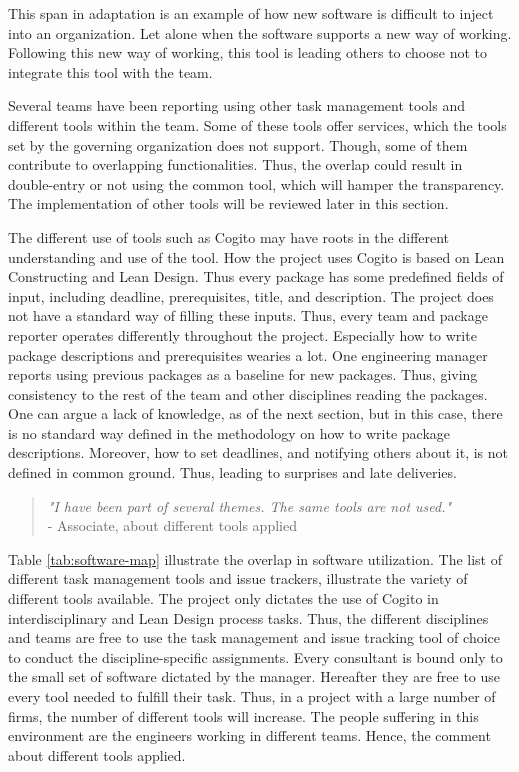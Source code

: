 This span in adaptation is an example of how new software is difficult to inject into an organization. Let alone when the software supports a new way of working. Following this new way of working, this tool is leading others to choose not to integrate this tool with the team.

Several teams have been reporting using other task management tools and different tools within the team. Some of these tools offer services, which the tools set by the governing organization does not support. Though, some of them contribute to overlapping functionalities. Thus, the overlap could result in double-entry or not using the common tool, which will hamper the transparency. The implementation of other tools will be reviewed later in this section. 

The different use of tools such as Cogito may have roots in the different understanding and use of the tool. How the project uses Cogito is based on Lean Constructing and Lean Design. Thus every package has some predefined fields of input, including deadline, prerequisites, title, and description. The project does not have a standard way of filling these inputs. Thus, every team and package reporter operates differently throughout the project. Especially how to write package descriptions and prerequisites wearies a lot. 
One engineering manager reports using previous packages as a baseline for new packages. Thus, giving consistency to the rest of the team and other disciplines reading the packages. One can argue a lack of knowledge, as of the next section, but in this case, there is no standard way defined in the methodology on how to write package descriptions. Moreover, how to set deadlines, and notifying others about it, is not defined in common ground. Thus, leading to surprises and late deliveries. 

\begin{quote}
    \textit{"I have been part of several themes. The same tools are not used."}
    \\ - Associate, about different tools applied
\end{quote}

Table \ref{tab:software-map} illustrate the overlap in software utilization. The list of different task management tools and issue trackers, illustrate the variety of different tools available. The project only dictates the use of Cogito in interdisciplinary and Lean Design process tasks. Thus, the different disciplines and teams are free to use the task management and issue tracking tool of choice to conduct the discipline-specific assignments. Every consultant is bound only to the small set of software dictated by the manager. Hereafter they are free to use every tool needed to fulfill their task. Thus, in a project with a large number of firms, the number of different tools will increase. The people suffering in this environment are the engineers working in different teams. Hence, the comment about different tools applied. 

